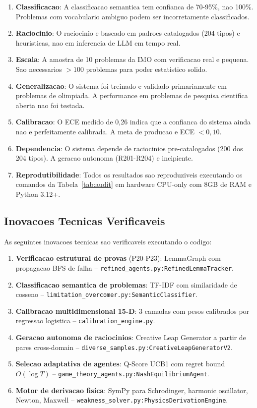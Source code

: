 \documentclass[5p]{elsarticle}
\begin{document}
\begin{enumerate}[label=(\arabic*)]
 \item \textbf{Classificacao}: A classificacao semantica tem confianca de
 70-95\%, nao 100\%. Problemas com vocabulario ambiguo podem ser
 incorretamente classificados.
 \item \textbf{Raciocinio}: O raciocinio e baseado em padroes catalogados
 (204 tipos) e heuristicas, nao em inferencia de LLM em tempo real.
 \item \textbf{Escala}: A amostra de 10 problemas da IMO com verificacao real
 e pequena. Sao necessarios $>100$ problemas para poder estatistico solido.
 \item \textbf{Generalizacao}: O sistema foi treinado e validado primariamente
 em problemas de olimpiada. A performance em problemas de pesquisa cientifica
 aberta nao foi testada.
 \item \textbf{Calibracao}: O ECE medido de 0,26 indica que a confianca do
 sistema ainda nao e perfeitamente calibrada. A meta de producao e ECE $<0,10$.
 \item \textbf{Dependencia}: O sistema depende de raciocinios pre-catalogados
 (200 dos 204 tipos). A geracao autonoma (R201-R204) e incipiente.
 \item \textbf{Reprodutibilidade}: Todos os resultados sao reproduziveis
 executando os comandos da Tabela~\ref{tab:audit} em hardware CPU-only com
 8GB de RAM e Python 3.12+.
\end{enumerate}

\subsection{Inovacoes Tecnicas Verificaveis}

As seguintes inovacoes tecnicas sao verificaveis executando o codigo:

\begin{enumerate}[label=(\arabic*)]
 \item \textbf{Verificacao estrutural de provas} (P20-P23): LemmaGraph com
 propagacao BFS de falha -- \texttt{refined\_agents.py:RefinedLemmaTracker}.
 \item \textbf{Classificacao semantica de problemas}: TF-IDF com similaridade
 de cosseno -- \texttt{limitation\_overcomer.py:SemanticClassifier}.
 \item \textbf{Calibracao multidimensional 15-D}: 3 camadas com pesos
 calibrados por regressao logistica -- \texttt{calibration\_engine.py}.
 \item \textbf{Geracao autonoma de raciocinios}: Creative Leap Generator a
 partir de pares cross-domain -- \texttt{diverse\_samples.py:CreativeLeapGeneratorV2}.
 \item \textbf{Selecao adaptativa de agentes}: Q-Score UCB1 com regret bound
 $O(\log T)$ -- \texttt{game\_theory\_agents.py:NashEquilibriumAgent}.
 \item \textbf{Motor de derivacao fisica}: SymPy para Schrodinger, harmonic
 oscillator, Newton, Maxwell -- \texttt{weakness\_solver.py:PhysicsDerivationEngine}.
\end{enumerate}
\end{document}
